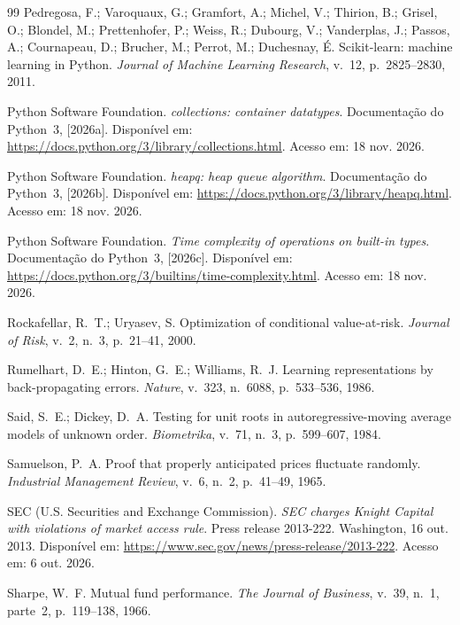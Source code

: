 \begin{thebibliography}{99}
Pedregosa, F.; Varoquaux, G.; Gramfort, A.; Michel, V.; Thirion, B.; Grisel, O.; Blondel, M.; Prettenhofer, P.; Weiss, R.; Dubourg, V.; Vanderplas, J.; Passos, A.; Cournapeau, D.; Brucher, M.; Perrot, M.; Duchesnay, É. Scikit-learn: machine learning in Python. \emph{Journal of Machine Learning Research}, v.~12, p.~2825--2830, 2011.

Python Software Foundation. \emph{collections: container datatypes}. Documentação do Python~3, [2026a]. Disponível em: \url{https://docs.python.org/3/library/collections.html}. Acesso em: 18 nov. 2026.

Python Software Foundation. \emph{heapq: heap queue algorithm}. Documentação do Python~3, [2026b]. Disponível em: \url{https://docs.python.org/3/library/heapq.html}. Acesso em: 18 nov. 2026.

Python Software Foundation. \emph{Time complexity of operations on built-in types}. Documentação do Python~3, [2026c]. Disponível em: \url{https://docs.python.org/3/builtins/time-complexity.html}. Acesso em: 18 nov. 2026.

Rockafellar, R.~T.; Uryasev, S. Optimization of conditional value-at-risk. \emph{Journal of Risk}, v.~2, n.~3, p.~21--41, 2000.

Rumelhart, D.~E.; Hinton, G.~E.; Williams, R.~J. Learning representations by back-propagating errors. \emph{Nature}, v.~323, n.~6088, p.~533--536, 1986.

Said, S.~E.; Dickey, D.~A. Testing for unit roots in autoregressive-moving average models of unknown order. \emph{Biometrika}, v.~71, n.~3, p.~599--607, 1984.

Samuelson, P.~A. Proof that properly anticipated prices fluctuate randomly. \emph{Industrial Management Review}, v.~6, n.~2, p.~41--49, 1965.

SEC (U.S. Securities and Exchange Commission). \emph{SEC charges Knight Capital with violations of market access rule}. Press release 2013-222. Washington, 16 out. 2013. Disponível em: \url{https://www.sec.gov/news/press-release/2013-222}. Acesso em: 6 out. 2026.

Sharpe, W.~F. Mutual fund performance. \emph{The Journal of Business}, v.~39, n.~1, parte~2, p.~119--138, 1966.


\end{thebibliography}
